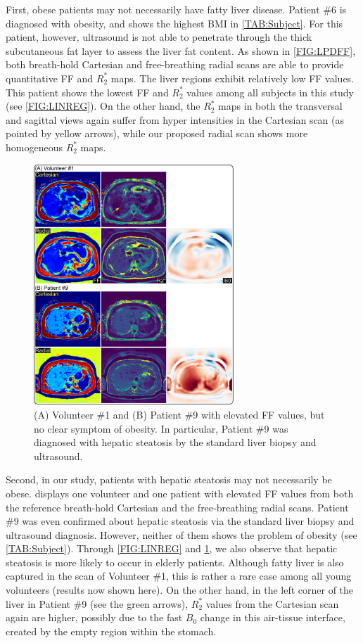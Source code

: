 \documentclass[journal,twoside,web]{ieeecolor}
\begin{document}
First, obese patients may not necessarily have fatty liver disease. 
Patient \#6 is diagnosed with obesity, 
and shows the highest BMI in \cref{TAB:Subject}. 
For this patient, however, ultrasound is not able to penetrate through 
the thick subcutaneous fat layer to assess the liver fat content. 
As shown in \cref{FIG:LPDFF}, 
both breath-hold Cartesian and free-breathing radial scans are able to 
provide quantitative FF and $R_2^*$ maps. The liver regions exhibit 
relatively low FF values. 
This patient shows the lowest FF and $R_2^*$ values 
among all subjects in this study (see \cref{FIG:LINREG}). 
On the other hand, the $R_2^*$ maps 
in both the transversal and sagittal views 
again suffer from hyper intensities in the Cartesian scan 
(as pointed by yellow arrows), 
while our proposed radial scan shows more homogeneous $R_2^*$ maps. 


\begin{figure}
	\centering
	\includegraphics[width=0.67\textwidth]{../../figures/tan9.pdf}
	\caption{(A) Volunteer \#1 and (B) Patient \#9 
		with elevated FF values, but no clear symptom of obesity.
		In particular, Patient \#9 was diagnosed with hepatic steatosis 
		by the standard liver biopsy and ultrasound.}
	\label{FIG:HPDFF}
\end{figure}

Second, in our study, patients with hepatic steatosis may not necessarily be obese. 
 displays one volunteer and one patient with elevated FF values from 
both the reference breath-hold Cartesian and the free-breathing radial 
scans. Patient \#9 was even confirmed about hepatic steatosis via 
the standard liver biopsy and ultrasound diagnosis. 
However, neither of them shows the problem of obesity (see \cref{TAB:Subject}). 
Through \cref{FIG:LINREG} and \cref{FIG:HPDFF}, 
we also observe that hepatic steatosis is more likely to occur in elderly patients. 
Although fatty liver is also captured in the scan of Volunteer \#1, 
this is rather a rare case among all young volunteers (results now shown here). 
On the other hand, in the left corner of the liver in Patient \#9 
(see the green arrows), 
$R_2^*$ values from the Cartesian scan again are higher, 
possibly due to the fast $B_0$ change in this air-tissue interface, 
created by the empty region within the stomach.
\end{document}
